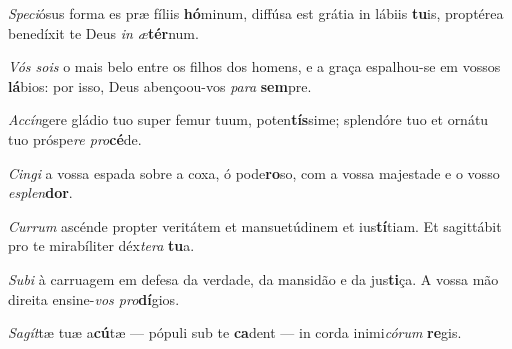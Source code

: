 \begin{greenumerate}
  \setcounter{enumi}{1}


  \item \textit{Speci}ósus forma es præ fíliis \textbf{hó}minum, {\GreDagger} diffúsa est grátia in lábiis \textbf{tu}is, {\GreStar} proptérea benedíxit te Deus \textit{in æ}\textbf{tér}num. 

  \switchcolumn\setcounter{enumi}{1}

  \item \textit{Vós sois} o mais belo entre os filhos dos homens, {\GreDagger} e a graça espalhou-se em vossos \textbf{lá}bios: {\GreStar} por isso, Deus abençoou-vos \textit{para} \textbf{sem}pre. 

  \switchcolumn*


  \item \textit{Accín}gere gládio tuo super femur tuum, poten\textbf{tís}sime; {\GreStar} splendóre tuo et ornátu tuo próspe\textit{re pro}\textbf{cé}de. 

  \switchcolumn%

  \item \textit{Cingi} a vossa espada sobre a coxa, ó pode\textbf{ro}so, {\GreStar} com a vossa majestade e o vosso \textit{esplen}\textbf{dor}. 

  \switchcolumn*


  \item \textit{Currum} ascénde propter veritátem et mansuetúdinem et ius\textbf{tí}tiam. {\GreStar} Et sagittábit pro te mirabíliter déx\textit{tera} \textbf{tu}a. 

  \switchcolumn%

  \item \textit{Subi} à carruagem em defesa da verdade, da mansidão e da jus\textbf{ti}ça. {\GreStar} A vossa mão direita ensine-\textit{vos pro}\textbf{dí}gios. 

  \switchcolumn*


  \item \textit{Sagít}tæ tuæ a\textbf{cú}tæ {\GreDagger} --- pópuli sub te \textbf{ca}dent --- {\GreStar} in corda inimi\textit{córum} \textbf{re}gis. 


\end{greenumerate}
